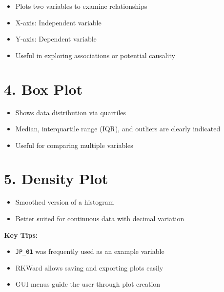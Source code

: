 \documentclass[
  letterpaper,
  DIV=11,
  numbers=noendperiod]{scrreprt}
\providecommand{\tightlist}{%
  \setlength{\itemsep}{0pt}\setlength{\parskip}{0pt}}
\begin{document}
\begin{itemize}
\tightlist
\item
  Plots two variables to examine relationships\\
\item
  X-axis: Independent variable\\
\item
  Y-axis: Dependent variable\\
\item
  Useful in exploring associations or potential causality
\end{itemize}

\section{4. Box Plot}\label{box-plot}

\begin{itemize}
\tightlist
\item
  Shows data distribution via quartiles\\
\item
  Median, interquartile range (IQR), and outliers are clearly
  indicated\\
\item
  Useful for comparing multiple variables
\end{itemize}

\section{5. Density Plot}\label{density-plot}

\begin{itemize}
\tightlist
\item
  Smoothed version of a histogram\\
\item
  Better suited for continuous data with decimal variation
\end{itemize}

\textbf{Key Tips:}

\begin{itemize}
\tightlist
\item
  \texttt{JP\_01} was frequently used as an example variable\\
\item
  RKWard allows saving and exporting plots easily\\
\item
  GUI menus guide the user through plot creation
\end{itemize}
\end{document}
